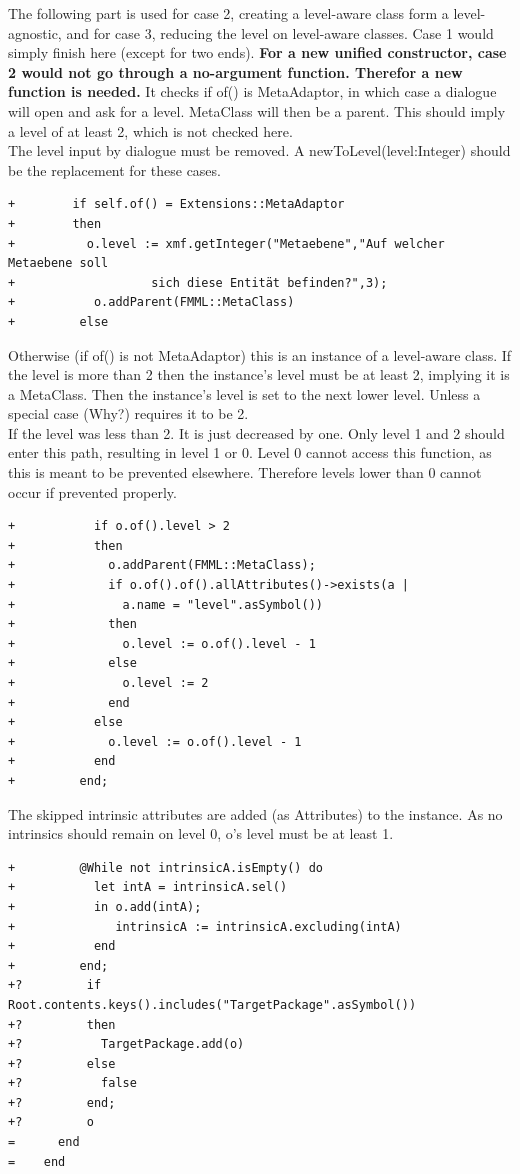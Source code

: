 \documentclass{scrreprt}
\begin{document}
The following part is used for case 2, creating a level-aware class form a level-agnostic, and for case 3, reducing the level on level-aware classes. Case 1 would simply finish here (except for two {\ttfamily end}s). \textbf{For a new unified constructor, case 2 would not go through a no-argument function. Therefor a new function is needed.}
It checks if of() is MetaAdaptor, in which case a dialogue will open and ask for a level. MetaClass will then be a parent. This should imply a level of at least 2, which is not checked here.\\
The level input by dialogue must be removed. A {\ttfamily newToLevel(level:Integer)} should be the replacement for these cases.
\begin{verbatim}
+        if self.of() = Extensions::MetaAdaptor
+        then
+          o.level := xmf.getInteger("Metaebene","Auf welcher Metaebene soll 
+					sich diese Entität befinden?",3);
+           o.addParent(FMML::MetaClass)
+         else
\end{verbatim}
Otherwise (if of() is not MetaAdaptor) this is an instance of a level-aware class. If the level is more than 2 then the instance's level must be at least 2, implying it is a MetaClass. Then the instance's level is set to the next lower level. Unless a special case (Why?) requires it to be 2.\\
If the level was less than 2. It is just decreased by one. Only level 1 and 2 should enter this path, resulting in level 1 or 0. Level 0 cannot access this function, as this is meant to be prevented elsewhere. Therefore levels lower than 0 cannot occur if prevented properly.
\begin{verbatim}
+           if o.of().level > 2
+           then
+             o.addParent(FMML::MetaClass);
+             if o.of().of().allAttributes()->exists(a |
+               a.name = "level".asSymbol())
+             then
+               o.level := o.of().level - 1
+             else
+               o.level := 2
+             end
+           else
+             o.level := o.of().level - 1
+           end
+         end;
\end{verbatim}
The skipped intrinsic attributes are added (as Attributes) to the instance. As no intrinsics should remain on level 0, o's level must be at least 1.
\begin{verbatim}
+         @While not intrinsicA.isEmpty() do
+           let intA = intrinsicA.sel()
+           in o.add(intA);
+              intrinsicA := intrinsicA.excluding(intA)
+           end
+         end;
+?         if Root.contents.keys().includes("TargetPackage".asSymbol())
+?         then
+?           TargetPackage.add(o)
+?         else
+?           false
+?         end;
+?         o
=      end
=    end
\end{verbatim}
\end{document}
